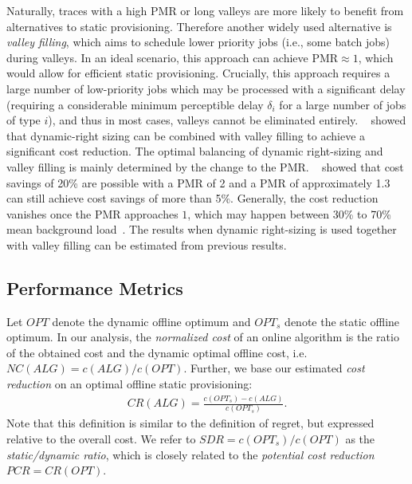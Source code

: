 Naturally, traces with a high PMR or long valleys are more likely to benefit from alternatives to static provisioning. Therefore another widely used alternative is \emph{valley filling}, which aims to schedule lower priority jobs (i.e., some batch jobs) during valleys. In an ideal scenario, this approach can achieve $\text{PMR} \approx 1$, which would allow for efficient static provisioning. Crucially, this approach requires a large number of low-priority jobs which may be processed with a significant delay (requiring a considerable minimum perceptible delay $\delta_i$ for a large number of jobs of type $i$), and thus in most cases, valleys cannot be eliminated entirely. \citeauthor{Lin2011}~\cite{Lin2011} showed that dynamic-right sizing can be combined with valley filling to achieve a significant cost reduction. The optimal balancing of dynamic right-sizing and valley filling is mainly determined by the change to the PMR. \citeauthor{Lin2011}~\cite{Lin2011} showed that cost savings of 20\% are possible with a PMR of 2 and a PMR of approximately 1.3 can still achieve cost savings of more than 5\%. Generally, the cost reduction vanishes once the PMR approaches $1$, which may happen between 30\% to 70\% mean background load~\cite{Lin2011}. The results when dynamic right-sizing is used together with valley filling can be estimated from previous results.

\subsection{Performance Metrics}

Let $OPT$ denote the dynamic offline optimum and $OPT_s$ denote the static offline optimum. In our analysis, the \emph{normalized cost} of an online algorithm is the ratio of the obtained cost and the dynamic optimal offline cost, i.e. $NC(ALG) = c(ALG) / c(OPT)$. Further, we base our estimated \emph{cost reduction} on an optimal offline static provisioning: \begin{align*}
    CR(ALG) = \frac{c(OPT_s) - c(ALG)}{c(OPT_s)}.
\end{align*} Note that this definition is similar to the definition of regret, but expressed relative to the overall cost. We refer to $SDR = c(OPT_s) / c(OPT)$ as the \emph{static/dynamic ratio}, which is closely related to the \emph{potential cost reduction} $PCR = CR(OPT)$.

